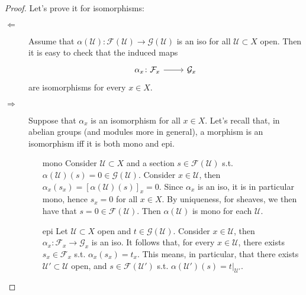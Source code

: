 \documentclass[../Main]{subfiles}
\begin{document}
\begin{proof}
	Let's prove it for isomorphisms:
	\begin{description}
		\item[$\Leftarrow$] Assume that $\alpha(\mathcal{U}) \colon \mathcal{F}(\mathcal{U}) \to 
			\mathcal{G}(\mathcal{U})$ is an iso for all $\mathcal{U} \subset X$ open.
			Then it is easy to check that the induced maps
			\begin{equation}
				\begin{tikzcd}
					\alpha_x\colon \mathcal{F}_x \arrow[r, "", rightarrow] &
			\mathcal{G}_x
				\end{tikzcd}
			\end{equation} 
			are isomorphisms for every $x \in X$.
		\item[$\Rightarrow$] Suppose that $\alpha_x$ is an isomorphism
			for all $x \in X$.
			Let's recall that, in abelian groups (and modules more in general),
			a morphism is an isomorphism
			iff it is both mono and epi.
			\begin{itemize}
				\item[mono] Consider $\mathcal{U} \subset X$ and
					a section $s \in \mathcal{F}(\mathcal{U})$
					s.t. $\alpha(\mathcal{U})(s) = 0 \in \mathcal{G}(\mathcal{U})$.
					Consider $x \in \mathcal{U}$, then $\alpha_x (s_x) = \left[ 
					\alpha(\mathcal{U})(s)\right]_x = 0$.
					Since $\alpha_x$ is an iso, it is in particular mono, hence
					$s_x = 0$ for all $x \in X$.
					By uniqueness, for sheaves, we then have that $s = 0 \in
					\mathcal{F}(\mathcal{U})$.
					Then $\alpha(\mathcal{U})$ is mono for each $\mathcal{U}$.

				\item[epi] Let $\mathcal{U} \subset X$ open and $t \in \mathcal{G}(\mathcal{U})$.
					Consider $x \in \mathcal{U}$, then 
					$\alpha_x \colon \mathcal{F}_x \to \mathcal{G}_x$ is an iso.
					It follows that, for every $x \in \mathcal{U}$,
					there exists $s_x \in \mathcal{F}_x$ s.t. $\alpha_x(s_x) = t_x$.
					This means, in particular, that there exists
					$\mathcal{U}' \subset \mathcal{U}$ open, and
					$s \in \mathcal{F}(\mathcal{U}')$
					s.t. $\alpha(\mathcal{U}')(s) = \left.t\right|_{\mathcal{U}'}$.


\end{itemize}
\end{description}
\end{proof}
\end{document}
